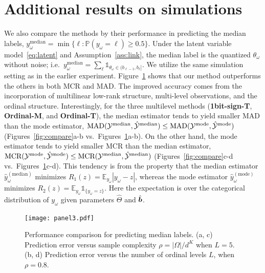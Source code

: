\documentclass{article}
\theoremstyle{plain}
\theoremstyle{definition}
\begin{document}
\section{Additional results on simulations}
We also compare the methods by their performance in predicting the median labels, $y_\omega^{\text{median}}=\min\{\ell\colon\mathbb{P}(y_\omega=\ell)\geq 0.5\}$. Under the latent variable model~\eqref{eq:latent} and Assumption~\ref{ass:link}, the median label is the quantized $\theta_\omega$ without noise; i.e.\ $y_\omega^{\text{median}}=\sum_\ell \mathds{1}_{\theta_\omega\in(b_{\ell-1},b_\ell]}$.
 We utilize the same simulation setting as in the earlier experiment. Figure~\ref{fig:compare2} shows that our method outperforms the others in both MCR and MAD. The improved accuracy comes from the incorporation of multilinear low-rank structure, multi-level observations, and the ordinal structure. Interestingly, for the three multilevel methods ({\bf 1bit-sign-T}, {\bf Ordinal-M}, and {\bf Ordinal-T}), the median estimator tends to yield smaller MAD than the mode estimator, $\text{MAD}(\mathcal{Y}^{\text{median}}, \hat {\mathcal{Y}}^{\text{median}})\leq \text{MAD}(\mathcal{Y}^{\text{mode}}, \hat {\mathcal{Y}}^{\text{mode}})$  (Figures~\ref{fig:compare}a-b vs.\ Figures~\ref{fig:compare2}a-b). On the other hand, the mode estimator tends to yield smaller MCR than the median estimator, $\text{MCR}(\mathcal{Y}^{\text{mode}}, \hat {\mathcal{Y}}^{\text{mode}})\leq\text{MCR}(\mathcal{Y}^{\text{median}}, \hat {\mathcal{Y}}^{\text{median}})$ (Figures~\ref{fig:compare}c-d vs.\ Figures~\ref{fig:compare2}c-d). This tendency is from the property that the median estimator $\hat y^{(\text{median})}_\omega$ minimizes $R_1(z)=\mathbb{E}_{y_\omega}|y_\omega-z|$, whereas the mode estimator $\hat y^{(\text{mode})}_\omega $ minimizes $R_2(z)=\mathbb{E}_{y_\omega}\mathds{1}_{\{y_\omega=z\}}$. Here the expectation is over the categorical distribution of $y_\omega$ given parameters $\hat \Theta$ and $\hat {\bm{b}}$.

\begin{figure}[ht]
\begin{center}
\texttt{[image: panel3.pdf]}
\end{center}
\caption{Performance comparison for predicting median labels. (a, c) Prediction error versus sample complexity $\rho=|\Omega|/d^K$ when $L=5$. (b, d) Prediction error versus the number of ordinal levels $L$, when $\rho=0.8.$}\label{fig:compare2}
\end{figure}
\end{document}
